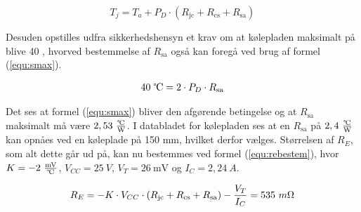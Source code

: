 \begin{equation}
\label{equ:tjmax}
T_j = T_a + P_D \cdot (R_{\mathrm{jc}} + R_{\mathrm{cs}} + R_{\mathrm{sa}})
\end{equation}

Desuden opstilles udfra sikkerhedshensyn et krav om at kølepladen maksimalt på blive 40 \celsius, hvorved bestemmelse af $R_{\mathrm{sa}}$ også kan foregå ved brug af formel (\ref{equ:smax}). 

\begin{equation}
\label{equ:smax}
40~\celsius = 2 \cdot P_D \cdot R_{\mathrm{sa}}
\end{equation}

Det ses at formel (\ref{equ:smax}) bliver den afgørende betingelse og at $R_{\mathrm{sa}}$ maksimalt må være $2,53~\tfrac{\celsius}{\mathrm{W}}$. I databladet for kølepladen ses at en $R_{\mathrm{sa}}$ på $2,4~\tfrac{\celsius}{\mathrm{W}}$ kan opnåes ved en køleplade på 150 mm, hvilket derfor vælges. Størrelsen af $R_E$, som alt dette går ud på, kan nu bestemmes ved formel (\ref{equ:rebestem}), hvor $K = - 2~\tfrac{\mathrm{mV}}{\celsius}$, $V_{CC} = 25~V$, $V_T = 26~\mathrm{mV}$ og $I_C = 2,24~A$.

\begin{equation}
\label{equ:rebestem}
R_E = - K \cdot V_{CC} \cdot (R_{\mathrm{jc}} + R_{\mathrm{cs}} + R_{\mathrm{sa}}) - \frac{V_T}{I_C} = 535~m\ohm
\end{equation}